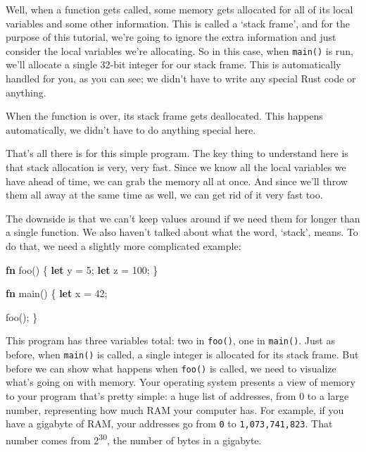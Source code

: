 \documentclass[a4paper,]{book}
\newenvironment{Shaded}{\begin{snugshade}}{\end{snugshade}}
\newcommand{\KeywordTok}[1]{\textcolor[rgb]{0.13,0.29,0.53}{\textbf{{#1}}}}
\newcommand{\DecValTok}[1]{\textcolor[rgb]{0.00,0.00,0.81}{{#1}}}
\newcommand{\NormalTok}[1]{{#1}}
\begin{document}
Well, when a function gets called, some memory gets allocated for all of
its local variables and some other information. This is called a `stack
frame', and for the purpose of this tutorial, we're going to ignore the
extra information and just consider the local variables we're
allocating. So in this case, when \texttt{main()} is run, we'll allocate
a single 32-bit integer for our stack frame. This is automatically
handled for you, as you can see; we didn't have to write any special
Rust code or anything.

When the function is over, its stack frame gets deallocated. This
happens automatically, we didn't have to do anything special here.

That's all there is for this simple program. The key thing to understand
here is that stack allocation is very, very fast. Since we know all the
local variables we have ahead of time, we can grab the memory all at
once. And since we'll throw them all away at the same time as well, we
can get rid of it very fast too.

The downside is that we can't keep values around if we need them for
longer than a single function. We also haven't talked about what the
word, `stack', means. To do that, we need a slightly more complicated
example:

\begin{Shaded}
\begin{Highlighting}[]
\KeywordTok{fn} \NormalTok{foo() \{}
    \KeywordTok{let} \NormalTok{y = }\DecValTok{5}\NormalTok{;}
    \KeywordTok{let} \NormalTok{z = }\DecValTok{100}\NormalTok{;}
\NormalTok{\}}

\KeywordTok{fn} \NormalTok{main() \{}
    \KeywordTok{let} \NormalTok{x = }\DecValTok{42}\NormalTok{;}

    \NormalTok{foo();}
\NormalTok{\}}
\end{Highlighting}
\end{Shaded}

This program has three variables total: two in \texttt{foo()}, one in
\texttt{main()}. Just as before, when \texttt{main()} is called, a
single integer is allocated for its stack frame. But before we can show
what happens when \texttt{foo()} is called, we need to visualize what's
going on with memory. Your operating system presents a view of memory to
your program that's pretty simple: a huge list of addresses, from 0 to a
large number, representing how much RAM your computer has. For example,
if you have a gigabyte of RAM, your addresses go from \texttt{0} to
\texttt{1,073,741,823}. That number comes from 2\textsuperscript{30},
the number of bytes in a gigabyte.
\end{document}
